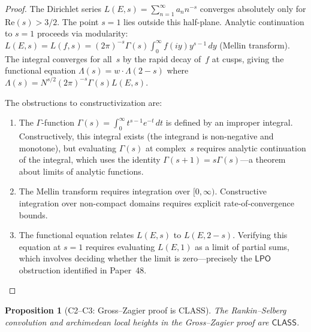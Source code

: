 \documentclass[11pt]{article}
\theoremstyle{plain}
\newtheorem{proposition}[theorem]{Proposition}
\theoremstyle{definition}
\theoremstyle{remark}
\newcommand{\LPO}{\ensuremath{\mathsf{LPO}}}
\newcommand{\CLASS}{\ensuremath{\mathsf{CLASS}}}
\begin{document}
\begin{proof}
The Dirichlet series $L(E,s) = \sum_{n=1}^\infty a_n n^{-s}$ converges absolutely only for $\mathrm{Re}(s) > 3/2$. The point $s = 1$ lies outside this half-plane. Analytic continuation to $s = 1$ proceeds via modularity: $L(E,s) = L(f,s) = (2\pi)^{-s}\Gamma(s)\int_0^\infty f(iy) y^{s-1}\,dy$ (Mellin transform). The integral converges for all~$s$ by the rapid decay of~$f$ at cusps, giving the functional equation $\Lambda(s) = w \cdot \Lambda(2-s)$ where $\Lambda(s) = N^{s/2}(2\pi)^{-s}\Gamma(s)L(E,s)$.

The obstructions to constructivization are:
\begin{enumerate}[nosep]
\item The $\Gamma$-function $\Gamma(s) = \int_0^\infty t^{s-1}e^{-t}\,dt$ is defined by an improper integral. Constructively, this integral exists (the integrand is non-negative and monotone), but evaluating $\Gamma(s)$ at complex~$s$ requires analytic continuation of the integral, which uses the identity $\Gamma(s+1) = s\Gamma(s)$---a theorem about limits of analytic functions.
\item The Mellin transform requires integration over $[0, \infty)$. Constructive integration over non-compact domains requires explicit rate-of-convergence bounds.
\item The functional equation relates $L(E,s)$ to $L(E, 2-s)$. Verifying this equation at $s = 1$ requires evaluating $L(E,1)$ as a limit of partial sums, which involves deciding whether the limit is zero---precisely the $\LPO$ obstruction identified in Paper~48.
\end{enumerate}
\end{proof}

\begin{proposition}[C2--C3: Gross--Zagier proof is CLASS]\label{prop:C2C3}
The Rankin--Selberg convolution and archimedean local heights in the Gross--Zagier proof are $\CLASS$.
\end{proposition}
\end{document}
